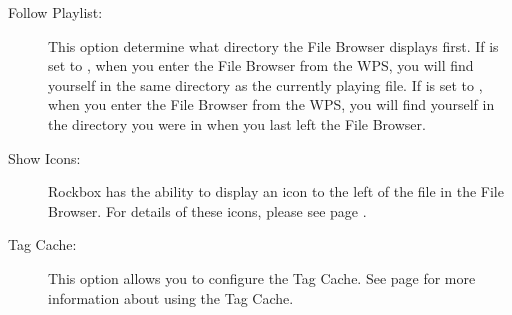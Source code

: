 \begin{description}
  \item[Follow Playlist:] 
  This option determine what directory the File Browser 
  displays first.  If  is set to , when 
  you enter the File Browser from the WPS, you will find yourself in the same 
  directory as the currently playing file.  If  is set 
  to , when you enter the File Browser from the WPS, you will find 
  yourself in the directory you were in when you last left the File Browser.
    
  \item[Show Icons:]
    Rockbox has the ability to display an icon to the left of the file 
    in the File Browser.  For details of these icons, please see page 
    \pageref{ref:Supportedfileformats}.
    
  \item[Tag Cache:]
  This option allows you to configure the Tag Cache.
  	See page \pageref{ref:tagcache} for more information about using
    the Tag Cache.
    
  \end{description}
